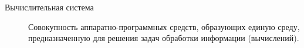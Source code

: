\Defines %
\begin{description}
    \item[Вычислительная система] Совокупность аппаратно-программных средств, образующих единую среду, предназначенную для решения задач обработки информации (вычислений).
\end{description}

